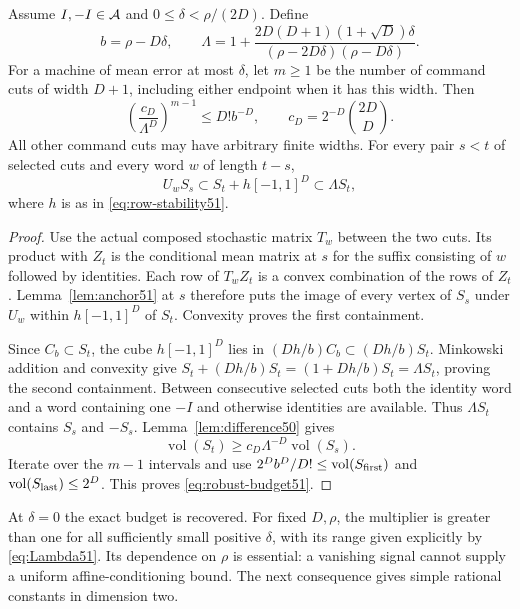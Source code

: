 \begin{theorem}
\label{thm:robust51}
Assume $I,-I\in\mathcal A$ and $0\le\delta<\rho/(2D)$. Define
\begin{equation}\label{eq:Lambda51}
 b=\rho-D\delta,\qquad
 \Lambda=1+\frac{2D(D+1)(1+\sqrt D)\delta}
                    {(\rho-2D\delta)(\rho-D\delta)}.
\end{equation}
For a machine of mean error at most $\delta$, let $m\ge1$ be the
number of command cuts of width $D+1$, including either endpoint
when it has this width. Then
\begin{equation}\label{eq:robust-budget51}
 \left(\frac{c_D}{\Lambda^D}\right)^{m-1}
       \le D!b^{-D},\qquad c_D=2^{-D}{2D\choose D}.
\end{equation}
All other command cuts may have arbitrary finite widths. For every
pair $s<t$ of selected cuts and every word $w$ of length $t-s$,
\begin{equation}\label{eq:approx-containment51}
 U_wS_s\subset S_t+h[-1,1]^D\subset\Lambda S_t,
\end{equation}
where $h$ is as in \eqref{eq:row-stability51}.
\end{theorem}
\begin{proof}
Use the actual composed stochastic matrix $T_w$ between the two cuts.
Its product with $Z_t$ is the conditional mean matrix at $s$ for the
suffix consisting of $w$ followed by identities. Each row of $T_wZ_t$
is a convex combination of the rows of $Z_t$.
Lemma~\ref{lem:anchor51} at $s$ therefore puts the image of every
vertex of $S_s$ under $U_w$ within $h[-1,1]^D$ of $S_t$.
Convexity proves the first containment.

Since $C_b\subset S_t$, the cube $h[-1,1]^D$ lies in
$(Dh/b)C_b\subset(Dh/b)S_t$. Minkowski addition and convexity give
$S_t+(Dh/b)S_t=(1+Dh/b)S_t=\Lambda S_t$, proving the second
containment. Between consecutive selected cuts both the identity word
and a word containing one $-I$ and otherwise identities are available.
Thus $\Lambda S_t$ contains $S_s$ and $-S_s$.
Lemma~\ref{lem:difference50} gives
\[
 \operatorname{vol}(S_t)\ge c_D\Lambda^{-D}
                                  \operatorname{vol}(S_s).
\]
Iterate over the $m-1$ intervals and use
$2^Db^D/D!\le\operatorname{vol}(S_{\rm first})$ and
$\operatorname{vol}(S_{\rm last})\le2^D$.
This proves \eqref{eq:robust-budget51}.
\end{proof}

At $\delta=0$ the exact budget is recovered. For fixed $D,\rho$,
the multiplier is greater than one for all sufficiently small
positive $\delta$, with its range given explicitly by
\eqref{eq:Lambda51}. Its dependence on $\rho$ is essential: a
vanishing signal cannot supply a uniform affine-conditioning bound.
The next consequence gives simple rational constants in dimension two.

